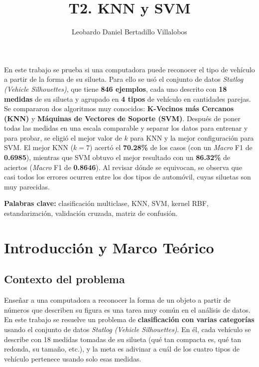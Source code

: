 \documentclass[11pt,letterpaper,twoside]{article}
\title{T2. KNN y SVM}
\author{Leobardo Daniel Bertadillo Villalobos}
\begin{document}
\parindent=0mm

\newpage

\setcounter{page}{1}

\begin{tcolorbox}[
    enhanced,
    colback=fondoclaro,
    colframe=azulutez,
    coltitle=white,
    fonttitle=\large\bfseries,
    title=Resumen,
    boxrule=1.5pt,
    arc=3mm,
    left=10pt,
    right=10pt,
    top=8pt,
    bottom=8pt
]
\noindent En este trabajo se prueba si una computadora puede reconocer el tipo de vehículo a partir de la forma de su silueta. Para ello se usó el conjunto de datos \textit{Statlog (Vehicle Silhouettes)}, que tiene \textbf{846 ejemplos}, cada uno descrito con \textbf{18 medidas} de su silueta y agrupado en \textbf{4 tipos} de vehículo en cantidades parejas. Se compararon dos algoritmos muy conocidos: \textbf{K-Vecinos más Cercanos (KNN)} y \textbf{Máquinas de Vectores de Soporte (SVM)}. Después de poner todas las medidas en una escala comparable y separar los datos para entrenar y para probar, se eligió el mejor valor de $k$ para KNN y la mejor configuración para SVM. El mejor KNN ($k=7$) acertó el \textbf{70.28\%} de los casos (con un \textit{Macro} F1 de \textbf{0.6985}), mientras que SVM obtuvo el mejor resultado con un \textbf{86.32\%} de aciertos (\textit{Macro} F1 de \textbf{0.8646}). Al revisar dónde se equivocan, se observa que casi todos los errores ocurren entre los dos tipos de automóvil, cuyas siluetas son muy parecidas.

\vspace{0.4cm}
\textcolor{azulutez}{\textbf{Palabras clave:}} clasificación multiclase, KNN, SVM, kernel RBF, estandarización, validación cruzada, matriz de confusión.
\end{tcolorbox}
\newpage

\renewcommand{\contentsname}{Índice}
\tableofcontents
\newpage

\setcounter{page}{1}

\section{Introducción y Marco Teórico}
\label{sec:introduccion}

\subsection{Contexto del problema}
Enseñar a una computadora a reconocer la forma de un objeto a partir de números que describen su figura es una tarea muy común en el análisis de datos. En este trabajo se resuelve un problema de \textbf{clasificación con varias categorías} usando el conjunto de datos \textit{Statlog (Vehicle Silhouettes)}. En él, cada vehículo se describe con 18 medidas tomadas de su silueta (qué tan compacta es, qué tan redonda, su tamaño, etc.), y la meta es adivinar a cuál de los cuatro tipos de vehículo pertenece usando solo esas medidas.
\end{document}
